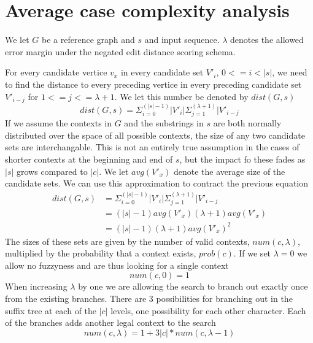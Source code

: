 \documentclass[thesis.tex]{subfiles}
\begin{document}
\chapter{Average case complexity analysis}
\label{sec:complexity_analysis}
We let $G$ be a reference graph and $s$ and input sequence. $\lambda$ denotes the allowed error margin under the negated edit distance scoring schema.\\
\par\noindent
For every candidate vertice $v_x$ in every candidate set $V'_i$, $0<=i<|s|$, we need to find the distance to every preceding vertice in every preceding candidate set $V'_{i-j}$ for $1<=j<=\lambda + 1$. We let this number be denoted by $dist(G, s)$
\begin{equation}
  dist(G, s)= \Sigma^{(|s|-1)}_{i=0}|V'_i|\Sigma^{(\lambda + 1)}_{j=1}|V'_{i-j}
\end{equation}
If we assume the contexts in $G$ and the substrings in $s$ are both normally distributed over the space of all possible contexts, the size of any two candidate sets are interchangable. This is not an entirely true assumption in the cases of shorter contexts at the beginning and end of $s$, but the impact fo these fades as $|s|$ grows compared to $|c|$. We let $avg(V'_x)$ denote the average size of the candidate sets. We can use this approximation to contract the previous equation
\begin{equation}
  \begin{split}
  dist(G, s)&=\Sigma^{(|s|-1)}_{i=0}|V'_i|\Sigma^{(\lambda+1)}_{j=1}|V'_{i-j}\\
  &=(|s|-1)avg(V'_x)(\lambda +1) avg(V'_x)\\
  &=(|s|-1)(\lambda +1)avg(V'_x)^2
  \end{split}
\end{equation}
The sizes of these sets are given by the number of valid contexts, $num(c, \lambda)$, multiplied by the probability that a context exists, $prob(c)$. If we set $\lambda=0$ we allow no fuzzyness and are thus looking for a single context
\begin{equation}
  num(c, 0)=1
\end{equation}
When increasing $\lambda$ by one we are allowing the search to branch out exactly once from the existing branches. There are $3$ possibilities for branching out in the suffix tree at each of the $|c|$ levels, one possibility for each other character. Each of the branches adds another legal context to the search
\begin{equation}
  num(c, \lambda) = 1 + 3|c|*num(c, \lambda - 1)
\end{equation}
\end{document}

